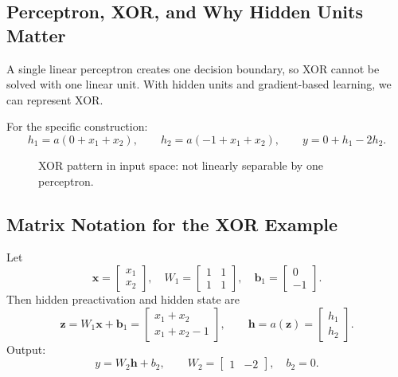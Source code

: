 \subsection{Perceptron, XOR, and Why Hidden Units Matter}
A single linear perceptron creates one decision boundary, so XOR cannot be solved
with one linear unit. With hidden units and gradient-based learning, we can represent XOR.

For the specific construction:
\[
h_1 = a(0+x_1+x_2),\qquad
h_2 = a(-1+x_1+x_2),\qquad
y = 0+h_1-2h_2.
\]

\begin{figure}[h!]
\centering
{}
\caption{XOR pattern in input space: not linearly separable by one perceptron.}
\end{figure}

\subsection{Matrix Notation for the XOR Example}
Let
\[
\mathbf{x}=
\begin{bmatrix}
x_1\\x_2
\end{bmatrix},
\quad
W_1=
\begin{bmatrix}
1 & 1\\
1 & 1
\end{bmatrix},
\quad
\mathbf{b}_1=
\begin{bmatrix}
0\\-1
\end{bmatrix}.
\]
Then hidden preactivation and hidden state are
\[
\mathbf{z}=W_1\mathbf{x}+\mathbf{b}_1
=
\begin{bmatrix}
x_1+x_2\\
x_1+x_2-1
\end{bmatrix},
\qquad
\mathbf{h}=a(\mathbf{z})=
\begin{bmatrix}
h_1\\h_2
\end{bmatrix}.
\]
Output:
\[
y = W_2\mathbf{h}+b_2,\qquad
W_2=\begin{bmatrix}1 & -2\end{bmatrix},\quad b_2=0.
\]

